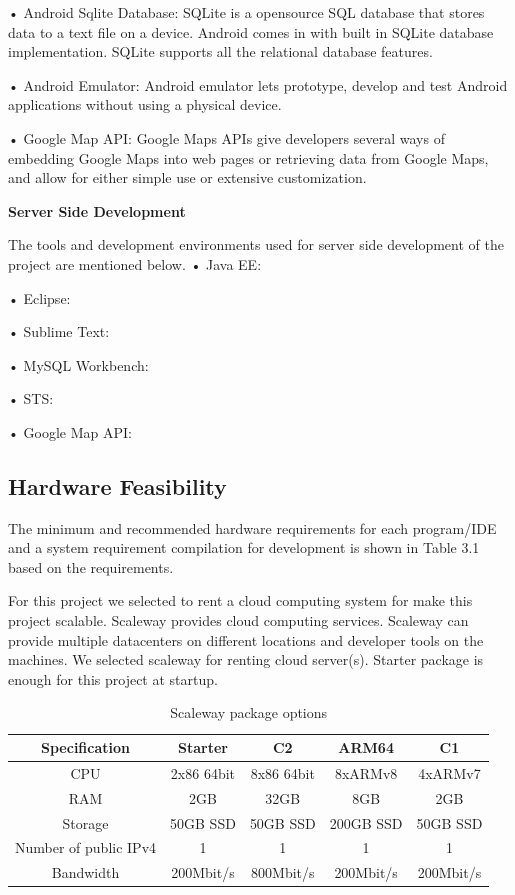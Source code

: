 • Android Sqlite Database: SQLite is a opensource SQL database that stores data to a text file on a device. Android comes in with built in SQLite database implementation. SQLite supports all the relational database features\cite{androidStudioSqlite}.
\newline

• Android Emulator: Android emulator lets prototype, develop and test Android applications without using a physical device\cite{androidEmulator}.
\newline

• Google Map API: Google Maps APIs give developers several ways of embedding Google Maps into web pages or retrieving data from Google Maps, and allow for either simple use or extensive customization\cite{googleMapAPI}.
\newline

\textbf{Server Side Development}

The tools and development environments used for server side development of the
project are mentioned below.
\newline
• Java EE:

• Eclipse:

• Sublime Text:

• MySQL Workbench:

• STS:

• Google Map API:


\subsection{Hardware Feasibility}
The minimum and recommended hardware requirements for each program/IDE and
a system requirement compilation for development is shown in Table 3.1 based on
the requirements.

For this project we selected to rent a cloud computing system for make this project scalable. Scaleway\cite{scaleway} provides cloud computing services. Scaleway can provide multiple datacenters on different locations and developer tools on the machines. We selected scaleway for renting cloud server(s). Starter package is enough for this project at startup.

\begin{table}[!ht]
\centering
\caption{Scaleway package options}
\label{minreq}
\begin{tabular}{|c|c|c|c|c|}
\hline
\textbf{Specification}& \textbf{Starter} & \textbf{C2}  & \textbf{ARM64} & \textbf{C1} \\ \hline
CPU                             & 2x86 64bit & 8x86 64bit  & 8xARMv8 & 4xARMv7 \\ \hline
RAM                             & 2GB & 32GB & 8GB & 2GB \\ \hline
Storage                         & 50GB SSD & 50GB SSD & 200GB SSD & 50GB SSD \\ \hline
Number of public IPv4  & 1 & 1 & 1 & 1  \\ \hline
Bandwidth                       & 200Mbit/s & 800Mbit/s & 200Mbit/s & 200Mbit/s \\ \hline
\end{tabular}
\end{table}

